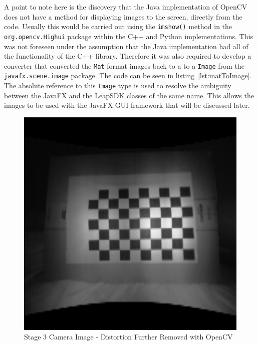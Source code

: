 \documentclass[11pt,oneside]{report}
\newcommand\code[1]{\texttt{#1}}
\begin{document}
		A point to note here is the discovery that the Java implementation of OpenCV does not have a method for displaying images to the screen, directly from the code.
		Usually this would be carried out using the \code{imshow()} method in the \code{org.opencv.Highui} package within the C++ and Python implementations.
		This was not foreseen under the assumption that the Java implementation had all of the functionality of the C++ library.
		Therefore it was also required to develop a converter that converted the \code{Mat} format images back to a to a \code{Image} from the \code{javafx.scene.image} package.
		The code can be seen in listing~\ref{lst:matToImage}.
		The absolute reference to this \code{Image} type is used to resolve the ambiguity between the JavaFX and the LeapSDK classes of the same name.
		This allows the images to be used with the JavaFX GUI framework that will be discussed later.
			
				
		
		\clearpage		
				
		\begin{figure}
			\centering
    				\includegraphics[scale=0.5]{3}
    				\caption{Stage 3 Camera Image - Distortion Further Removed with OpenCV \protect {\label{fig:image_3}}}

		\end{figure}	
		
\end{document}
